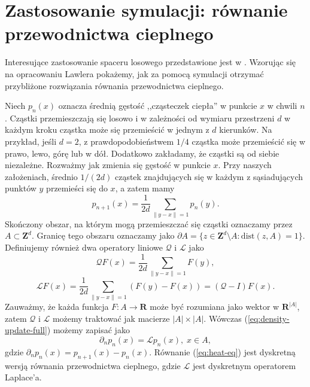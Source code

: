 \section{Zastosowanie symulacji: równanie przewodnictwa cieplnego}\label{sec:simulation}
Interesujące zastosowanie spaceru losowego przedstawione jest w \cite{LawlerRandomWalk}.
Wzorując się na opracowaniu Lawlera pokażemy, jak za pomocą symulacji otrzymać przybliżone rozwiązania równania przewodnictwa cieplnego.

Niech $p_n(x)$ oznacza średnią gęstość ,,cząsteczek ciepła'' w punkcie $x$ w chwili $n$.
Cząstki przemieszczają się losowo i w zależności od wymiaru przestrzeni $d$ w każdym kroku cząstka może się przemieścić w jednym z $d$ kierunków.
Na przykład, jeśli $d = 2$, z prawdopodobieństwem $1/4$ cząstka może przemieścić się w prawo, lewo, górę lub w dół.
Dodatkowo zakładamy, że cząstki są od siebie niezależne.
Rozważmy jak zmienia się gęstość w punkcie $x$.
Przy naszych założeniach, średnio $1/(2d)$ cząstek znajdujących się w każdym z sąsiadujących punktów $y$ przemieści się do $x$, a zatem mamy
\begin{equation}\label{eq:density-update-full}
    p_{n+1}(x) = \frac{1}{2d} \sum_{\lVert y-x\rVert=1} p_n(y).
\end{equation}
Skończony obszar, na którym mogą przemieszczać się cząstki oznaczamy przez $A \subset \mathbf{Z}^d$.
Granicę tego obszaru oznaczamy jako $\partial A = \{z \in \mathbf{Z}^d \setminus A :  \textrm{dist}(z, A) = 1\}$.
Definiujemy również dwa operatory liniowe $\mathcal{Q}$ i $\mathcal{L}$ jako
\begin{equation*}
    \mathcal{Q} F(x) = \frac{1}{2d} \sum_{\lVert y - x \rVert = 1} F(y),
\end{equation*}
\begin{equation*}
    \mathcal{L}F(x) = \frac{1}{2d} \sum_{\lVert y - x \rVert = 1} (F(y) - F(x))
    = (\mathcal{Q}-I)F(x).
\end{equation*}
Zauważmy, że każda funkcja $F: A \to \mathbf{R}$ może być rozumiana jako wektor w $\mathbf{R}^{|A|}$, zatem $\mathcal{Q}$ i $\mathcal{L}$ możemy traktować jak macierze $|A| \times |A|$.
Wówczas (\ref{eq:density-update-full}) możemy zapisać jako
\begin{equation}\label{eq:heat-eq}
    \partial_n p_n(x) = \mathcal{L}p_n(x), \; x \in A, 
\end{equation}
gdzie $\partial_n p_n(x) = p_{n+1}(x) - p_n(x)$.
Równanie (\ref{eq:heat-eq}) jest dyskretną wersją równania przewodnictwa cieplnego, gdzie $\mathcal{L}$ jest dyskretnym operatorem Laplace'a.

